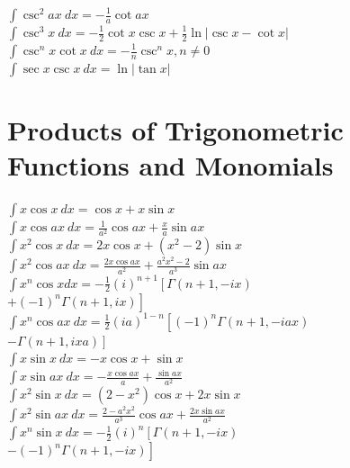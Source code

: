 \documentclass[10pt,letterpaper,landscape]{cheatsheet}
\begin{document}
$
\int \csc^2 ax\ dx = -\frac{1}{a} \cot ax 
$\\

$
\int \csc^3 x\ dx = -\frac{1}{2}\cot x \csc x + \frac{1}{2} \ln | \csc x - \cot x | 
$\\

$
\int \csc^nx \cot x\ dx = -\frac{1}{n}\csc^n x, n\ne 0
$\\

$
\int \sec x \csc x \ dx = \ln | \tan x | 
$\\


\section*{Products of Trigonometric Functions and Monomials}

$
\int x \cos x \ dx = \cos x + x \sin x 
$\\

$
\int x \cos ax \ dx = \frac{1}{a^2} \cos ax + \frac{x}{a} \sin ax 
$\\

$
\int x^2 \cos x \ dx = 2 x \cos x + \left( x^2 - 2 \right) \sin x 
$\\

$
\int x^2 \cos ax \ dx = \frac{2 x \cos ax }{a^2} + \frac{ a^2 x^2 - 2  }{a^3} \sin ax 
$\\

$
\int  x^n \cos x dx = 
-\frac{1}{2}(i)^{n+1}\left[ \Gamma(n+1, -ix) 
\right. $\\$  \left.
+ (-1)^n \Gamma(n+1, ix)\right] 
$\\

$
\int x^n \cos ax \ dx =
 \frac{1}{2}(ia)^{1-n}\left[ (-1)^n  \Gamma(n+1, -iax) 
\right. $\\$  \left.
 -\Gamma(n+1, ixa)\right] 
$\\

$
\int x \sin x\ dx = -x \cos x + \sin x 
$\\

$
\int x \sin ax\ dx = -\frac{x \cos ax}{a} + \frac{\sin ax}{a^2} 
$\\

$
\int x^2 \sin x\ dx = \left(2-x^2\right) \cos x + 2 x \sin x
$\\

$
\int x^2 \sin ax\ dx =\frac{2-a^2x^2}{a^3}\cos ax +\frac{ 2 x \sin ax}{a^2} 
$\\

$
\int x^n \sin x \ dx = -\frac{1}{2}(i)^n\left[ \Gamma(n+1, -ix) 
\right. $\\$  \left.
 - (-1)^n\Gamma(n+1, -ix)\right] 
$\\
\end{document}
